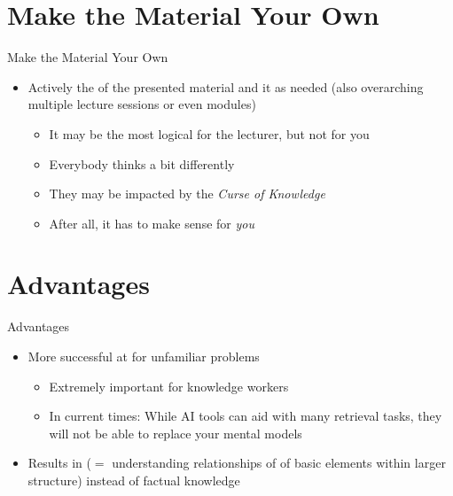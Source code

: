 \documentclass{ercisbeamer}
\begin{document}
\section{Make the Material Your Own}
\begin{frame}{Make the Material Your Own}
    \begin{tbox}
        \begin{itemize}
            \item Actively  the  of the presented material and  it as needed (also overarching multiple lecture sessions or even modules)
            \begin{itemize}
                \item It may be the most logical for the lecturer, but not for you
                \item Everybody thinks a bit differently
                \item They may be impacted by the \emph{Curse of Knowledge}
                \item After all, it has to make sense for \emph{you}
            \end{itemize}
        \end{itemize}
    \end{tbox}
\end{frame}
\setbgimage{}

\section{Advantages}
\begin{frame}{Advantages}
    \begin{itemize}
        \item More successful at  for unfamiliar problems
        \begin{itemize}
            \item Extremely important for knowledge workers
            \item In current times: While AI tools  can aid with many retrieval tasks, they will not be able to replace your mental models 
        \end{itemize}
        \item Results in  ($=$ understanding relationships of of basic elements within larger structure) instead of factual knowledge
    \end{itemize}
\end{frame}
\end{document}

